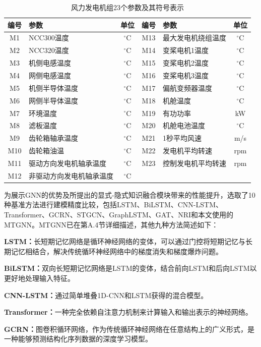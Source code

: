 \begin{table}[htbp]
\centering
\caption{风力发电机组23个参数及其符号表示}
\label{tab:appA-params23}
\small
\begin{tabular}{clccl c}
\toprule
编号 & 参数 & 单位 & 编号 & 参数 & 单位 \\
\midrule
M1 & NCC300温度 & $^\circ$C & M13 & 最大发电机绕组温度 & $^\circ$C \\
M2 & NCC320温度 & $^\circ$C & M14 & 变桨电机1温度 & $^\circ$C \\
M3 & 机侧电感温度 & $^\circ$C & M15 & 变桨电机2温度 & $^\circ$C \\
M4 & 网侧电感温度 & $^\circ$C & M16 & 变桨电机3温度 & $^\circ$C \\
M5 & 机侧半导体温度 & $^\circ$C & M17 & 偏航变频器温度 & $^\circ$C \\
M6 & 网侧半导体温度 & $^\circ$C & M18 & 机舱温度 & $^\circ$C \\
M7 & 环境温度 & $^\circ$C & M19 & 有功功率 & kW \\
M8 & 滤板温度 & $^\circ$C & M20 & 机舱电池温度 & $^\circ$C \\
M9 & 齿轮箱轴承温度 & $^\circ$C & M21 & 1秒平均风速 & m/s \\
M10 & 齿轮箱油温 & $^\circ$C & M22 & 发电机平均转速 & rpm \\
M11 & 驱动方向发电机轴承温度 & $^\circ$C & M23 & 控制发电机平均转速 & rpm \\
M12 & 非驱动方向发电机轴承温度 & $^\circ$C & & & \\
\bottomrule
\end{tabular}
\end{table}

为展示GNN的优势及所提出的显式-隐式知识融合模块带来的性能提升，选取了10种基准方法进行建模精度比较，包括LSTM、BiLSTM、CNN-LSTM、Transformer、GCRN、STGCN、GraphLSTM、GAT、NRI和本文使用的MTGNN。MTGNN已在第A.4节详细描述，其他九种方法简述如下：

\textbf{LSTM：}长短期记忆网络是循环神经网络的变体，可以通过门控将短期记忆与长期记忆相结合，解决传统循环神经网络中的梯度消失和梯度爆炸问题。

\textbf{BiLSTM：}双向长短期记忆网络是LSTM的变体，结合前向LSTM和后向LSTM以更好地处理输入特征。

\textbf{CNN-LSTM：}通过简单堆叠1D-CNN和LSTM获得的混合模型。

\textbf{Transformer：}一种完全依赖自注意力机制来计算输入和输出表示的神经网络。

\textbf{GCRN：}图卷积循环网络，作为传统循环神经网络在任意结构上的广义形式，是一种能够预测结构化序列数据的深度学习模型。

